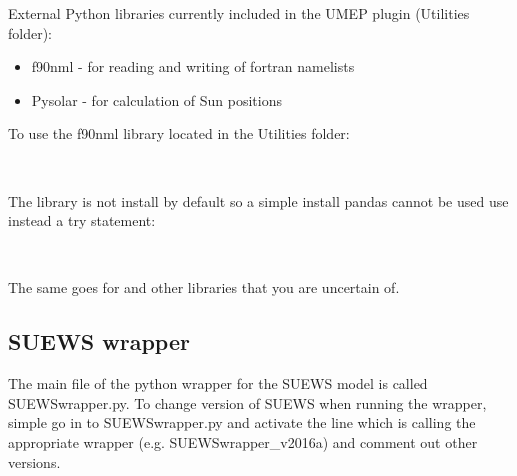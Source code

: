 \documentclass[letterpaper,10pt,english]{sphinxmanual}
\begin{document}
External Python libraries currently included in the UMEP plugin
(Utilities folder):
\begin{itemize}
\item {} 
f90nml - for reading and writing of fortran namelists

\item {} 
Pysolar - for calculation of Sun positions

\end{itemize}

To use the f90nml library located in the Utilities folder:

%
\begin{sphinxVerbatim}[commandchars=\\\{\}]
   
\end{sphinxVerbatim}

The  library is not install by default so a simple install
pandas cannot be used use instead a try statement:

%
\begin{sphinxVerbatim}[commandchars=\\\{\}]
     
  
      
\end{sphinxVerbatim}

The same goes for  and other libraries that you are
uncertain of.


\subsection{SUEWS wrapper}
\label{\detokenize{DevelopmentGuidelines:suews-wrapper}}
The main file of the python wrapper for the SUEWS model is called
SUEWSwrapper.py. To change version of SUEWS when running the wrapper,
simple go in to SUEWSwrapper.py and activate the line which is calling
the appropriate wrapper (e.g. SUEWSwrapper\_v2016a) and comment out
other versions.
\end{document}
